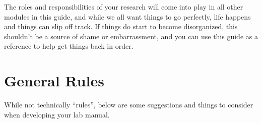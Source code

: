 \documentclass[
]{book}
\begin{document}
The roles and responsibilities of your research will come into play in all other modules in this guide, and while we all want things to go perfectly, life happens and things can slip off track. If things do start to become disorganized, this shouldn't be a source of shame or embarrassment, and you can use this guide as a reference to help get things back in order.

\hypertarget{general-rules}{%
\section*{General Rules}\label{general-rules}}

While not technically ``rules'', below are some suggestions and things to consider when developing your lab manual.
\end{document}
